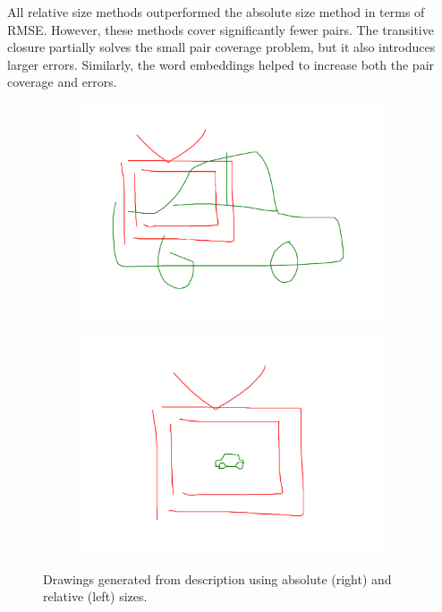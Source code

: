 All relative size methods outperformed the absolute size method in terms of RMSE. However, these methods cover significantly fewer pairs. The transitive closure partially solves the small pair coverage problem, but it also introduces larger errors. Similarly, the word embeddings helped to increase both the pair coverage and errors.

\begin{figure}[ht]
    \centering
        \begin{subfigure}{0.45\textwidth}
            \centering
            \includegraphics[width=\textwidth]{figures/car_on_tv_abs.pdf}
        \end{subfigure}
        \begin{subfigure}{0.45\textwidth}
            \centering
            \includegraphics[width=\textwidth]{figures/car_on_tv_rel.pdf}
        \end{subfigure}
    \caption[Comparison of absolute and relative size method]{Drawings generated from description \protect{} using absolute (right) and relative (left) sizes.}
    \label{fig:absolute_vs_relative}
\end{figure}

